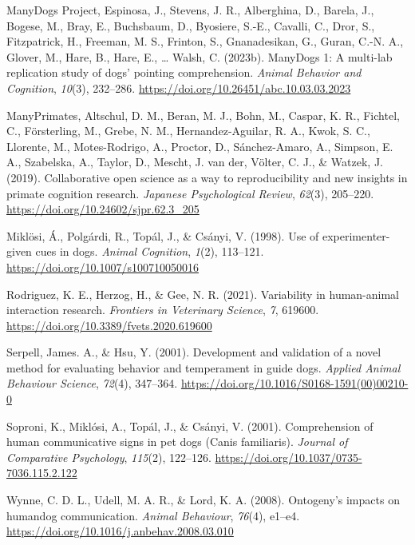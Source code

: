 \documentclass[
  pub,floatsintext]{apa6}
\newlength{\cslhangindent}
\newlength{\cslentryspacingunit} %
\newenvironment{CSLReferences}[2] %
 {%
  \setlength{\parindent}{0pt}
  \ifodd #1
  \let\oldpar\par
  \def\par{\hangindent=\cslhangindent\oldpar}
  \fi
  \setlength{\parskip}{#2\cslentryspacingunit}
 }%
 {}
\begin{document}
\begin{CSLReferences}{1}{0}
\leavevmode{}%
ManyDogs Project, Espinosa, J., Stevens, J. R., Alberghina, D., Barela, J., Bogese, M., Bray, E., Buchsbaum, D., Byosiere, S.-E., Cavalli, C., Dror, S., Fitzpatrick, H., Freeman, M. S., Frinton, S., Gnanadesikan, G., Guran, C.-N. A., Glover, M., Hare, B., Hare, E., \ldots{} Walsh, C. (2023b). {ManyDogs} 1: {A} multi-lab replication study of dogs' pointing comprehension. \emph{Animal Behavior and Cognition}, \emph{10}(3), 232--286. \url{https://doi.org/10.26451/abc.10.03.03.2023}

\leavevmode{}%
ManyPrimates, Altschul, D. M., Beran, M. J., Bohn, M., Caspar, K. R., Fichtel, C., Försterling, M., Grebe, N. M., Hernandez-Aguilar, R. A., Kwok, S. C., Llorente, M., Motes-Rodrigo, A., Proctor, D., Sánchez-Amaro, A., Simpson, E. A., Szabelska, A., Taylor, D., Mescht, J. van der, Völter, C. J., \& Watzek, J. (2019). Collaborative open science as a way to reproducibility and new insights in primate cognition research. \emph{Japanese Psychological Review}, \emph{62}(3), 205--220. \url{https://doi.org/10.24602/sjpr.62.3_205}

\leavevmode{}%
Miklösi, Á., Polgárdi, R., Topál, J., \& Csányi, V. (1998). Use of experimenter-given cues in dogs. \emph{Animal Cognition}, \emph{1}(2), 113--121. \url{https://doi.org/10.1007/s100710050016}

\leavevmode{}%
Rodriguez, K. E., Herzog, H., \& Gee, N. R. (2021). Variability in human-animal interaction research. \emph{Frontiers in Veterinary Science}, \emph{7}, 619600. \url{https://doi.org/10.3389/fvets.2020.619600}

\leavevmode{}%
Serpell, James. A., \& Hsu, Y. (2001). Development and validation of a novel method for evaluating behavior and temperament in guide dogs. \emph{Applied Animal Behaviour Science}, \emph{72}(4), 347--364. \url{https://doi.org/10.1016/S0168-1591(00)00210-0}

\leavevmode{}%
Soproni, K., Miklósi, A., Topál, J., \& Csányi, V. (2001). Comprehension of human communicative signs in pet dogs ({Canis} familiaris). \emph{Journal of Comparative Psychology}, \emph{115}(2), 122--126. \url{https://doi.org/10.1037/0735-7036.115.2.122}

\leavevmode{}%
Wynne, C. D. L., Udell, M. A. R., \& Lord, K. A. (2008). Ontogeny's impacts on human{\textendash}dog communication. \emph{Animal Behaviour}, \emph{76}(4), e1--e4. \url{https://doi.org/10.1016/j.anbehav.2008.03.010}

\end{CSLReferences}
\end{document}
